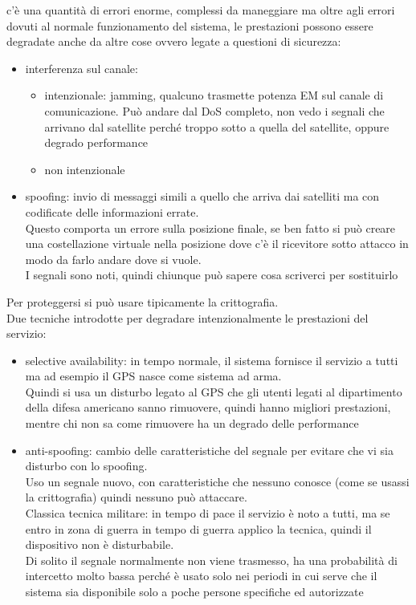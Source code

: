 \documentclass[oneside, 12pt]{extbook}
\begin{document}
c'è una quantità di errori enorme, complessi da maneggiare ma oltre agli errori dovuti al normale funzionamento del sistema, le prestazioni possono essere degradate anche da altre cose ovvero legate a questioni di sicurezza:
\begin{itemize}
	\item interferenza sul canale:
	\begin{itemize}
		\item intenzionale: jamming, qualcuno trasmette potenza EM sul canale di comunicazione. Può andare dal DoS completo, non vedo i segnali che arrivano dal satellite perché troppo sotto a quella del satellite, oppure degrado performance
		\item non intenzionale
	\end{itemize}
	\item spoofing: invio di messaggi simili a quello che arriva dai satelliti ma con codificate delle informazioni errate.\\
	Questo comporta un errore sulla posizione finale, se ben fatto si può creare una costellazione virtuale nella posizione dove c'è il ricevitore sotto attacco in modo da farlo andare dove si vuole.\\
	I segnali sono noti, quindi chiunque può sapere cosa scriverci per sostituirlo
\end{itemize}
Per proteggersi si può usare tipicamente la crittografia.\\
Due tecniche introdotte per degradare intenzionalmente le prestazioni del servizio:
\begin{itemize}
	\item selective availability: in tempo normale, il sistema fornisce il servizio a tutti ma ad esempio il GPS nasce come sistema ad arma.\\
	Quindi si usa un disturbo legato al GPS che gli utenti legati al dipartimento della difesa americano sanno rimuovere, quindi hanno migliori prestazioni, mentre chi non sa come rimuovere ha un degrado delle performance
	\item anti-spoofing: cambio delle caratteristiche del segnale per evitare che vi sia disturbo con lo spoofing.\\
	Uso un segnale nuovo, con caratteristiche che nessuno conosce (come se usassi la crittografia) quindi nessuno può attaccare.\\
	Classica tecnica militare: in tempo di pace il servizio è noto a tutti, ma se entro in zona di guerra in tempo di guerra applico la tecnica, quindi il dispositivo non è disturbabile.\\
	Di solito il segnale normalmente non viene trasmesso, ha una probabilità di intercetto molto bassa perché è usato solo nei periodi in cui serve che il sistema sia disponibile solo a poche persone specifiche ed autorizzate
\end{itemize}
\end{document}
